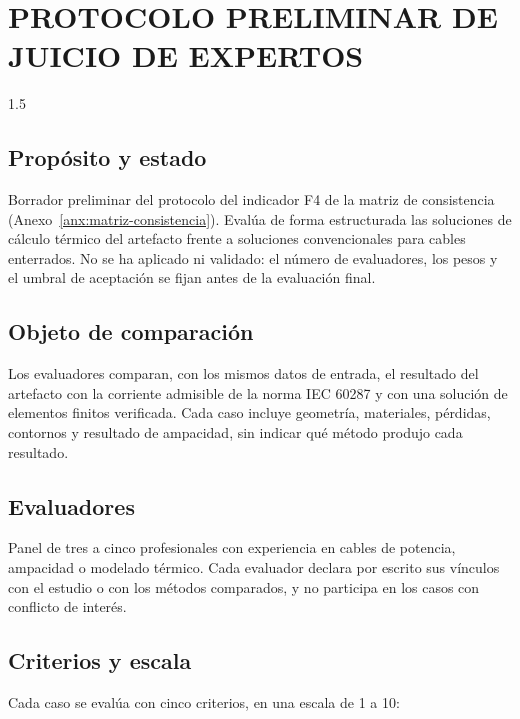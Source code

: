 \section{PROTOCOLO PRELIMINAR DE JUICIO DE EXPERTOS}
\label{anx:protocolo-expertos}

\begin{spacing}{1.5}
\subsection{Propósito y estado}

Borrador preliminar del protocolo del indicador F4 de la matriz de consistencia (Anexo~\ref{anx:matriz-consistencia}). Evalúa de forma estructurada las soluciones de cálculo térmico del artefacto frente a soluciones convencionales para cables enterrados. No se ha aplicado ni validado: el número de evaluadores, los pesos y el umbral de aceptación se fijan antes de la evaluación final.

\subsection{Objeto de comparación}

Los evaluadores comparan, con los mismos datos de entrada, el resultado del artefacto con la corriente admisible de la norma IEC 60287 \parencite{iec60287} y con una solución de elementos finitos verificada. Cada caso incluye geometría, materiales, pérdidas, contornos y resultado de ampacidad, sin indicar qué método produjo cada resultado.

\subsection{Evaluadores}

Panel de tres a cinco profesionales con experiencia en cables de potencia, ampacidad o modelado térmico. Cada evaluador declara por escrito sus vínculos con el estudio o con los métodos comparados, y no participa en los casos con conflicto de interés.

\subsection{Criterios y escala}

Cada caso se evalúa con cinco criterios, en una escala de 1 a 10:


\end{spacing}

